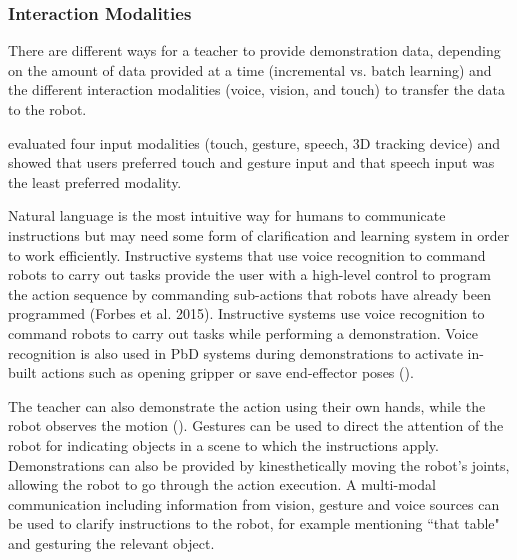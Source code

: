 
\subsubsection{Interaction Modalities}
There are different ways for a teacher to provide demonstration data, depending on the amount of data provided at a time (incremental vs. batch learning) and the different interaction modalities (voice, vision, and touch) to transfer the data to the robot.

\cite{profanter2015analysis} evaluated four input modalities (touch, gesture, speech, 3D tracking device) and showed that users preferred touch and gesture input and that speech input was the least preferred modality.

Natural language is the most intuitive way for humans to communicate instructions but may need some form of clarification and learning system in order to work efficiently. 
Instructive systems that use voice recognition to command robots to carry out tasks provide the user with a high-level control to program the action sequence by commanding sub-actions that robots have already been programmed (Forbes et al. 2015).
Instructive systems use voice recognition to command robots to carry out tasks while performing a demonstration.
Voice recognition is also used in PbD systems during demonstrations to activate in-built actions such as opening gripper or save end-effector poses (\cite{alexandrova2014robot}).

The teacher can also demonstrate the action using their own hands, while the robot observes the motion (\cite{kuniyoshi1994learning}).
Gestures can be used to direct the attention of the robot for indicating objects in a scene to which the instructions apply.
Demonstrations can also be provided by kinesthetically moving the robot's joints, allowing the robot to go through the action execution.
A multi-modal communication including information from vision, gesture and voice sources can be used to clarify instructions to the robot, for example mentioning ``that table" and gesturing the relevant object.


